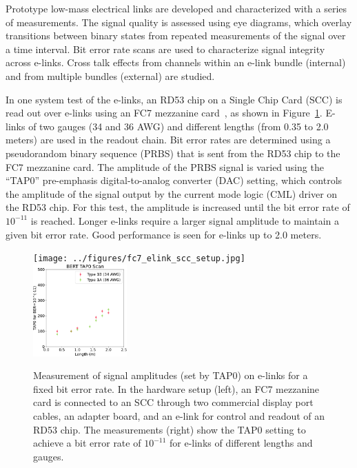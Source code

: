 \documentclass[a4paper,11pt]{article}
\newcommand{\fig}{Figure}
\begin{document}

Prototype low-mass electrical links are developed and characterized with a series of measurements.
The signal quality is assessed using eye diagrams, which overlay transitions between binary states from repeated measurements of the signal over a time interval.
Bit error rate scans are used to characterize signal integrity across e-links.
Cross talk effects from channels within an e-link bundle (internal) and from multiple bundles (external) are studied.


In one system test of the e-links, an RD53 chip on a Single Chip Card (SCC) is read out over e-links using an FC7 mezzanine card~\cite{ref:fc7}, as shown in \fig~\ref{fig:tap0_vs_length}.
E-links of two gauges (34 and 36 AWG) and different lengths (from 0.35 to 2.0 meters) are used in the readout chain.
Bit error rates are determined using a pseudorandom binary sequence (PRBS) that is sent from the RD53 chip to the FC7 mezzanine card.
The amplitude of the PRBS signal is varied using the ``TAP0'' pre-emphasis digital-to-analog converter (DAC) setting, which controls the amplitude of the signal output by the current mode logic (CML) driver on the RD53 chip.
For this test, the amplitude is increased until the bit error rate of $10^{-11}$ is reached.
Longer e-links require a larger signal amplitude to maintain a given bit error rate.
Good performance is seen for e-links up to 2.0 meters.

\begin{figure}[htbp]
\centering
\texttt{[image: ../figures/fc7\_elink\_scc\_setup.jpg]}
\qquad
\includegraphics[width=0.32\textwidth,origin=c]{../figures/BERT_TAP0_vs_Length-crop.pdf}
\caption{
\label{fig:tap0_vs_length}
Measurement of signal amplitudes (set by TAP0) on e-links for a fixed bit error rate.
In the hardware setup (left), an FC7 mezzanine card is connected to an SCC through two commercial display port cables, an adapter board, and an e-link for control and readout of an RD53 chip.
The measurements (right) show the TAP0 setting to achieve a bit error rate of $10^{-11}$ for e-links of different lengths and gauges.
}
\end{figure}
\end{document}
